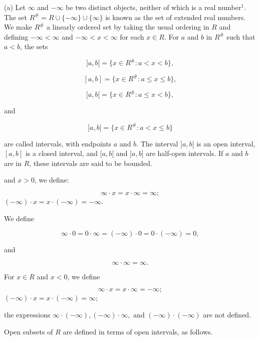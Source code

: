 (a) Let $\infty$ and $-\infty$ be two distinct objects, neither of which is a real number$^1$. The set $R^{\#} = R \cup \{-\infty\} \cup \{\infty\}$ is known as the set of extended real numbers. We make $R^{\#}$ a linearly ordered set by taking the usual ordering in $R$ and defining $-\infty < \infty$ and $-\infty < x < \infty$ for each $x \in R$. For $a$ and $b$ in $R^{\#}$ such that $a < b$, the sets

$$
]a, b[ = \{x \in R^{\#}: a < x < b\},
$$

$$
[a, b] = \{x \in R^{\#}: a \leq x \leq b\},
$$

$$
[a, b[ = \{x \in R^{\#}: a \leq x < b\},
$$

and

$$
]a, b] = \{x \in R^{\#}: a < x \leq b\}
$$

are called intervals, with endpoints $a$ and $b$. The interval $]a, b[$ is an open interval, $[a, b]$ is a closed interval, and $[a, b[$ and $]a, b]$ are half-open intervals. If $a$ and $b$ are in $R$, these intervals are said to be bounded.

and $x > 0$, we define:

$$\infty \cdot x = x \cdot \infty = \infty;$$
$(-\infty) \cdot x = x \cdot (-\infty) = -\infty.$

We define

$$\infty \cdot 0 = 0 \cdot \infty = (-\infty) \cdot 0 = 0 \cdot (-\infty) = 0,$$

and

$$\infty \cdot \infty = \infty.$$

For $x \in R$ and $x < 0$, we define

$$\infty \cdot x = x \cdot \infty = -\infty;$$
$(-\infty) \cdot x = x \cdot (-\infty) = \infty;$

the expressions $\infty \cdot (-\infty), (-\infty) \cdot \infty,$ and $(-\infty) \cdot (-\infty)$ are not defined.

Open subsets of $R$ are defined in terms of open intervals, as follows.